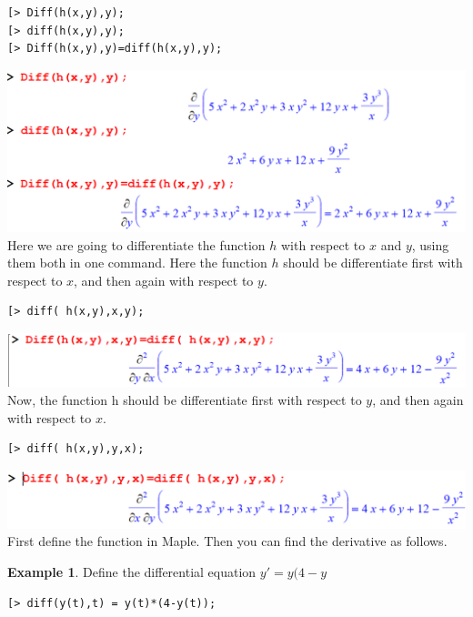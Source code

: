 \documentclass[
]{book}
\theoremstyle{definition}
\theoremstyle{definition}
\newtheorem{example}{Example}[chapter]
\theoremstyle{definition}
\theoremstyle{definition}
\theoremstyle{remark}
\begin{document}
\begin{verbatim}
[> Diff(h(x,y),y);
[> diff(h(x,y),y);
[> Diff(h(x,y),y)=diff(h(x,y),y);
\end{verbatim}

\includegraphics{figures/Diff/Diff 6.1 -4.png}
Here we are going to differentiate the function \(h\) with respect to \(x\) and \(y\), using them both in one command. Here the function \(h\) should be differentiate first with respect to \(x\), and then again with respect to \(y\).

\begin{verbatim}
[> diff( h(x,y),x,y);
\end{verbatim}

\includegraphics{figures/Diff/Diff 6.1 -5.png}
Now, the function h should be differentiate first with respect to \(y\), and then again with respect to \(x\).

\begin{verbatim}
[> diff( h(x,y),y,x);
\end{verbatim}

\includegraphics{figures/Diff/Diff 6.1 -6.png}
First define the function in Maple. Then you can find the derivative as follows.

\begin{example}
\protect\hypertarget{exm:unnamed-chunk-26}{}\label{exm:unnamed-chunk-26}Define the differential equation \(y' =y(4-y\)
\end{example}

\begin{verbatim}
[> diff(y(t),t) = y(t)*(4-y(t));
\end{verbatim}
\end{document}

